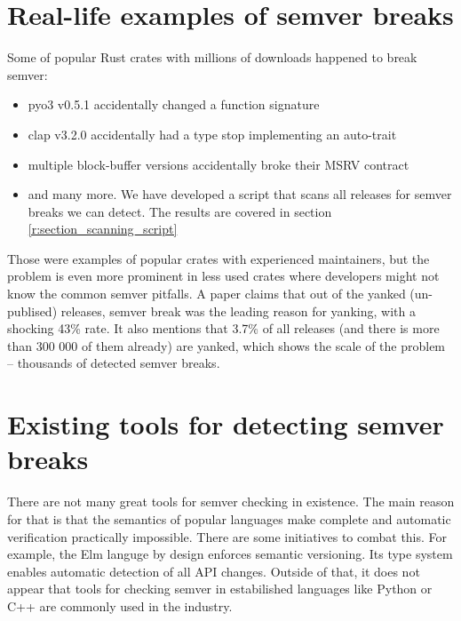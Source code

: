 \documentclass[licencjacka,en]{pracamgr}
\begin{document}
\section{Real-life examples of semver breaks} \label{r:section_real_life_semver_breaks}

Some of popular Rust crates with millions of downloads happened to break semver:
\begin{itemize}
    \item {\ttfamily pyo3 v0.5.1} accidentally changed a function signature \cite{pyo3-issue}
    \item {\ttfamily clap v3.2.0} accidentally had a type stop implementing an auto-trait \cite{clap-issue}
    \item multiple {\ttfamily block-buffer} versions accidentally broke their MSRV contract \cite{block-buffer-issue}
    \item and many more. We have developed a script that scans all releases
		for semver breaks we can detect. The results are covered in section \ref{r:section_scanning_script}
\end{itemize}

Those were examples of popular crates with experienced maintainers, but the problem is even more prominent in less used crates
where developers might not know the common semver pitfalls. A paper \cite{paper}
claims that out of the yanked (un-publised) releases,
semver break was the leading reason for yanking, with a shocking 43\% rate.
It also mentions that 3.7\% of all releases (and there is more than 300 000 of them already)
are yanked, which shows the scale of the problem -- thousands of detected semver breaks.

\section{Existing tools for detecting semver breaks}\label{r:section_existing_semver_tools}

There are not many great tools for semver checking in existence.
The main reason for that is that the semantics of popular languages
make complete and automatic verification practically impossible.
There are some initiatives to combat this. For example,
the Elm languge\cite{elm-lang} by design enforces semantic versioning.
Its type system enables automatic detection of all API changes.
Outside of that, it does not appear that tools for checking semver
in estabilished languages like Python or C++ are commonly used in the industry.
\end{document}
